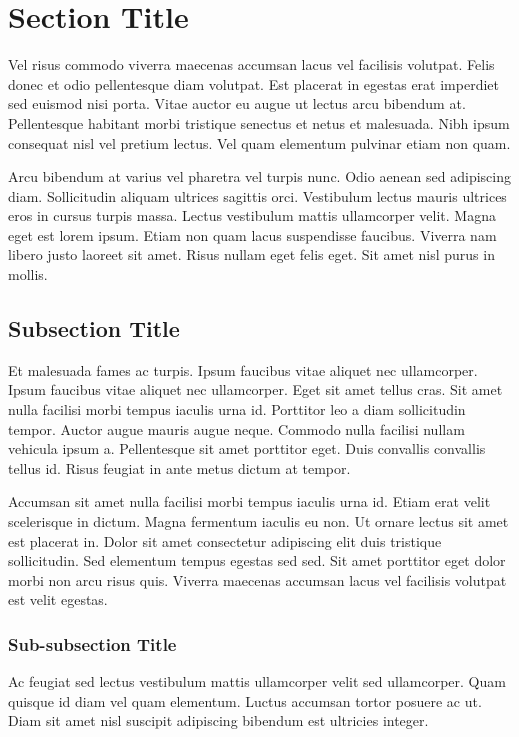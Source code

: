 \documentclass[fleqn, 11pt, twoside]{IOEGC}
\begin{document}
    
\maketitle
\thispagestyle{firstpage} 

\section{Section Title}
Vel risus commodo viverra maecenas accumsan lacus vel facilisis volutpat. Felis donec et odio pellentesque diam volutpat. Est placerat in egestas erat imperdiet sed euismod nisi porta. Vitae auctor eu augue ut lectus arcu bibendum at. Pellentesque habitant morbi tristique senectus et netus et malesuada. Nibh ipsum consequat nisl vel pretium lectus. Vel quam elementum pulvinar etiam non quam. 

Arcu bibendum at varius vel pharetra vel turpis nunc. Odio aenean sed adipiscing diam. Sollicitudin aliquam ultrices sagittis orci. Vestibulum lectus mauris ultrices eros in cursus turpis massa. Lectus vestibulum mattis ullamcorper velit. Magna eget est lorem ipsum. Etiam non quam lacus suspendisse faucibus. Viverra nam libero justo laoreet sit amet. Risus nullam eget felis eget. Sit amet nisl purus in mollis.

\subsection{Subsection Title}
Et malesuada fames ac turpis. Ipsum faucibus vitae aliquet nec ullamcorper. Ipsum faucibus vitae aliquet nec ullamcorper. Eget sit amet tellus cras. Sit amet nulla facilisi morbi tempus iaculis urna id. Porttitor leo a diam sollicitudin tempor. Auctor augue mauris augue neque. Commodo nulla facilisi nullam vehicula ipsum a. Pellentesque sit amet porttitor eget. Duis convallis convallis tellus id. Risus feugiat in ante metus dictum at tempor. 

Accumsan sit amet nulla facilisi morbi tempus iaculis urna id. Etiam erat velit scelerisque in dictum. Magna fermentum iaculis eu non. Ut ornare lectus sit amet est placerat in. Dolor sit amet consectetur adipiscing elit duis tristique sollicitudin. Sed elementum tempus egestas sed sed. Sit amet porttitor eget dolor morbi non arcu risus quis. Viverra maecenas accumsan lacus vel facilisis volutpat est velit egestas.

\subsubsection{Sub-subsection Title}
Ac feugiat sed lectus vestibulum mattis ullamcorper velit sed ullamcorper. Quam quisque id diam vel quam elementum. Luctus accumsan tortor posuere ac ut. Diam sit amet nisl suscipit adipiscing bibendum est ultricies integer. 
\end{document}
